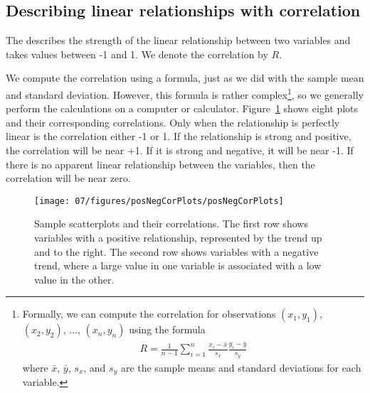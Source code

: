 \subsection{Describing linear relationships with correlation}

\begin{termBox}{
The  describes the strength of the linear relationship between two variables and takes values between -1 and 1. We denote the correlation by $R$.}
\end{termBox}

We compute the correlation using a formula, just as we did with the sample mean and standard deviation. However, this formula is rather complex\footnote{Formally, we can compute the correlation for observations $(x_1, y_1)$, $(x_2, y_2)$, ..., $(x_n, y_n)$ using the formula
\begin{eqnarray*}
R = \frac{1}{n-1}\sum_{i=1}^{n} \frac{x_i-\bar{x}}{s_x}\frac{y_i-\bar{y}}{s_y}
\end{eqnarray*}
where $\bar{x}$, $\bar{y}$, $s_x$, and $s_y$ are the sample means and standard deviations for each variable.}, so we generally perform the calculations on a computer or calculator. Figure~\ref{posNegCorPlots} shows eight plots and their corresponding correlations. Only when the relationship is perfectly linear is the correlation either -1 or 1. If the relationship is strong and positive, the correlation will be near +1. If it is strong and negative, it will be near -1. If there is no apparent linear relationship between the variables, then the correlation will be near zero.
\begin{figure}
   \centering
   \texttt{[image: 07/figures/posNegCorPlots/posNegCorPlots]}
   \caption{Sample scatterplots and their correlations. The first row shows variables with a positive relationship, represented by the trend up and to the right. The second row shows variables with a negative trend, where a large value in one variable is associated with a low value in the other.}
   \label{posNegCorPlots}
\end{figure}

